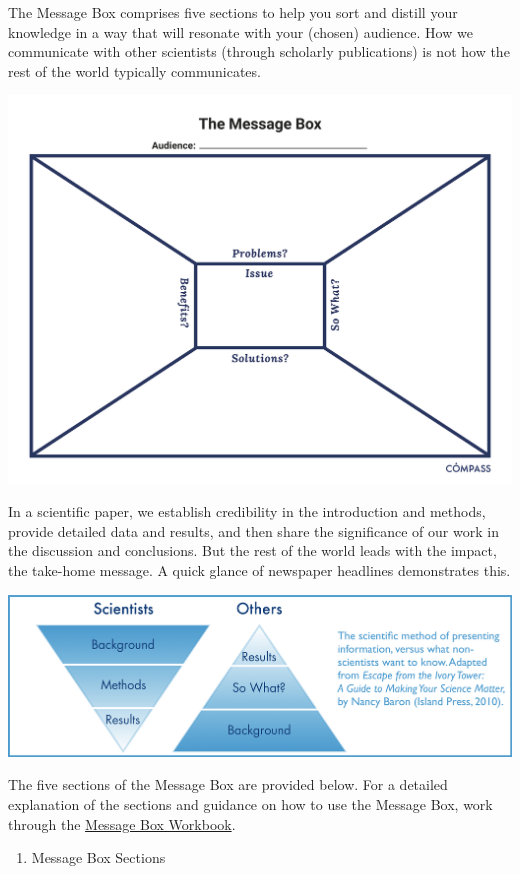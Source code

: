 \documentclass[
]{book}
\providecommand{\tightlist}{%
  \setlength{\itemsep}{0pt}\setlength{\parskip}{0pt}}
\begin{document}
The Message Box comprises five sections to help you sort and distill your knowledge in a way that will resonate with your (chosen) audience. How we communicate with other scientists (through scholarly publications) is not how the rest of the world typically communicates.

\includegraphics{images/message-box-blank.png}

In a scientific paper, we establish credibility in the introduction and methods, provide detailed data and results, and then share the significance of our work in the discussion and conclusions. But the rest of the world leads with the impact, the take-home message. A quick glance of newspaper headlines demonstrates this.

\includegraphics{images/Communication.png}

The five sections of the Message Box are provided below. For a detailed explanation of the sections and guidance on how to use the Message Box, work through the \href{https://www.compassscicomm.org/wp-content/uploads/2020/05/The-Message-Box-Workbook.pdf}{Message Box Workbook}.

\begin{enumerate}
\def\labelenumi{\arabic{enumi}.}
\setcounter{enumi}{2}
\tightlist
\item
  Message Box Sections
\end{enumerate}
\end{document}

